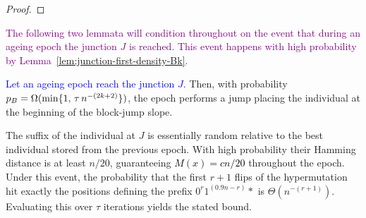 \begin{proof}
\end{proof}

\textcolor{purple}{The following two lemmata will condition throughout on the event that during an ageing epoch the junction $J$ is reached.
This event happens with high probability by Lemma~\ref{lem:junction-first-density-Bk}.}

\begin{lemma} \label{lem:BJO-epoch}
	\textcolor{blue}{Let an ageing epoch reach the junction $J$.} %
	Then, with probability $\textcolor{black}{p_B}=\Omega(\min\{1,\,\tau\,n^{-(2k+2)}\})$, the epoch performs a jump placing the individual at the beginning of the block-jump slope.
\end{lemma}

The suffix of the individual at $J$ is essentially random relative to the best individual stored from the 
previous epoch. 
With high probability their Hamming distance is at least $n/20$, guaranteeing 
\textcolor{black}{$M(x)= cn/20$} throughout the epoch.  
Under this event, the probability that the first $r+1$ flips of the hypermutation hit exactly the positions defining the prefix $0^{r}1^{(0.9n-r)} *$ is $\Theta(n^{-(r+1)})$.
Evaluating this over $\tau$ iterations yields the stated bound.


